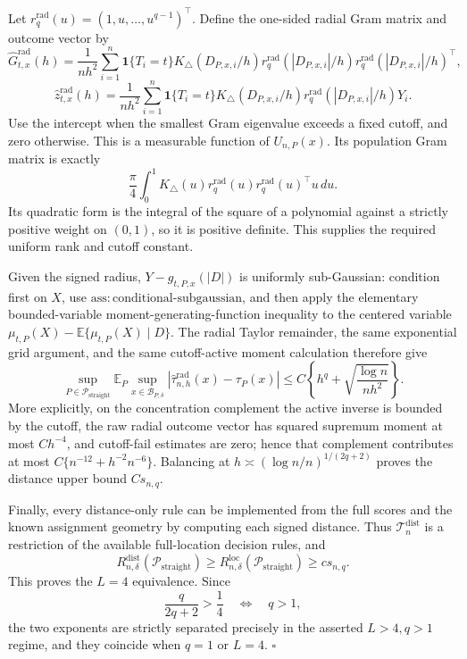 Let \(r_q^{\mathrm{rad}}(u)=(1,u,\ldots,u^{q-1})^\top\).  Define the one-sided radial Gram matrix and outcome vector by
\[
 \widehat G^{\mathrm{rad}}_{t,x}(h)=\frac1{nh^2}\sum_{i=1}^n
 \mathbf 1\{T_i=t\}K_\triangle(D_{P,x,i}/h)
 r_q^{\mathrm{rad}}(|D_{P,x,i}|/h)
 r_q^{\mathrm{rad}}(|D_{P,x,i}|/h)^\top,
\]
\[
 \widehat z^{\mathrm{rad}}_{t,x}(h)=\frac1{nh^2}\sum_{i=1}^n
 \mathbf 1\{T_i=t\}K_\triangle(D_{P,x,i}/h)
 r_q^{\mathrm{rad}}(|D_{P,x,i}|/h)Y_i.
\]
Use the intercept when the smallest Gram eigenvalue exceeds a fixed cutoff, and zero otherwise.  This is a measurable function of \(U_{n,P}(x)\).  Its population Gram matrix is exactly
\[
 \frac\pi4\int_0^1K_\triangle(u)r_q^{\mathrm{rad}}(u)
 r_q^{\mathrm{rad}}(u)^\top u\,du.
\]
Its quadratic form is the integral of the square of a polynomial against a strictly positive weight on \((0,1)\), so it is positive definite.  This supplies the required uniform rank and cutoff constant.

Given the signed radius, \(Y-g_{t,P,x}(|D|)\) is uniformly sub-Gaussian: condition first on \(X\), use \(\mathrm{ass:conditional\text{-}subgaussian}\), and then apply the elementary bounded-variable moment-generating-function inequality to the centered variable \(\mu_{t,P}(X)-\mathbb E\{\mu_{t,P}(X)\mid D\}\).  The radial Taylor remainder, the same exponential grid argument, and the same cutoff-active moment calculation therefore give
\[
 \sup_{P\in\mathcal P_{\mathrm{straight}}}
 \mathbb E_P\sup_{x\in\mathcal B_{P,\delta}}
 |\widehat\tau^{\mathrm{rad}}_{n,h}(x)-\tau_P(x)|
 \leq C\left\{h^q+\sqrt{\frac{\log n}{nh^2}}\right\}.
\]
More explicitly, on the concentration complement the active inverse is bounded by the cutoff, the raw radial outcome vector has squared supremum moment at most \(Ch^{-4}\), and cutoff-fail estimates are zero; hence that complement contributes at most \(C\{n^{-12}+h^{-2}n^{-6}\}\).  Balancing at \(h\asymp(\log n/n)^{1/(2q+2)}\) proves the distance upper bound \(Cs_{n,q}\).

Finally, every distance-only rule can be implemented from the full scores and the known assignment geometry by computing each signed distance.  Thus \(\mathcal T_n^{\mathrm{dist}}\) is a restriction of the available full-location decision rules, and
\[
 R_{n,\delta}^{\mathrm{dist}}(\mathcal P_{\mathrm{straight}})
 \geq R_{n,\delta}^{\mathrm{loc}}(\mathcal P_{\mathrm{straight}})
 \geq c s_{n,q}.
\]
This proves the \(L=4\) equivalence.  Since
\[
 \frac{q}{2q+2}>\frac14\quad\Longleftrightarrow\quad q>1,
\]
the two exponents are strictly separated precisely in the asserted \(L>4,q>1\) regime, and they coincide when \(q=1\) or \(L=4\).  \(\square\)